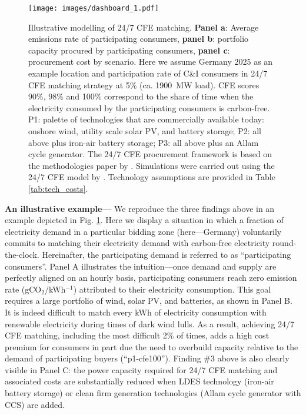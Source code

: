 \documentclass[pdflatex,sn-basic, Numbered]{sn-jnl}%
\theoremstyle{thmstyleone}%
\theoremstyle{thmstyletwo}%
\theoremstyle{thmstylethree}%
\begin{document}
\begin{figure}[htbp]
    \centering
    \texttt{[image: images/dashboard\_1.pdf]}
    \captionsetup{width=\textwidth}
    \caption{Illustrative modelling of 24/7 CFE matching.
    \textbf{Panel a}: Average emissions rate of participating consumers,
    \textbf{panel b}: portfolio capacity procured by participating consumers,
    \textbf{panel c}: procurement cost by scenario.
    Here we assume Germany 2025 as an example location and participation rate of C\&I consumers in 24/7 CFE matching strategy at 5\% (ca. 1900~MW load).
    CFE scores 90\%, 98\% and 100\% correspond to the share of time when the electricity consumed by the participating consumers is carbon-free.
    P1: palette of technologies that are commercially available today: onshore wind, utility scale solar PV, and battery storage; P2: all above plus iron-air battery storage; P3: all above plus an Allam cycle generator. The 24/7 CFE procurement framework is based on the methodologies paper by \citet{google-methodologies}. Simulations were carried out using the 24/7 CFE model by \citet{riepin-zenodo-systemlevel247}. Technology assumptions are provided in Table \ref{tab:tech_costs}.\\
    }\label{fig:dashboard}
\end{figure}

\textbf{An illustrative example---} We reproduce the three findings above in an example depicted in Fig. \ref{fig:dashboard}.
Here we display a situation in which a fraction of electricity demand in a particular bidding zone (here---Germany) voluntarily commits to matching their electricity demand with carbon-free electricity round-the-clock.
Hereinafter, the participating demand is referred to as \enquote{participating consumers}.
Panel A illustrates the intuition---once demand and supply are perfectly aligned on an hourly basis, participating consumers reach zero emission rate (gCO$_2$/kWh$^{-1}$) attributed to their electricity consumption. This goal requires a large portfolio of wind, solar PV, and batteries, as shown in Panel B. It is indeed difficult to match every kWh of electricity consumption with renewable electricity during times of dark wind lulls. As a result, achieving 24/7 CFE matching, including the most difficult 2\% of times, adds a high cost premium for consumers in part due the need to overbuild capacity relative to the demand of participating buyers (\enquote{p1-cfe100}). Finding \#3 above is also clearly visible in Panel C: the power capacity required for 24/7 CFE matching and associated costs are substantially reduced when LDES technology (iron-air battery storage) or clean firm generation technologies (Allam cycle generator with CCS) are added.
\end{document}
